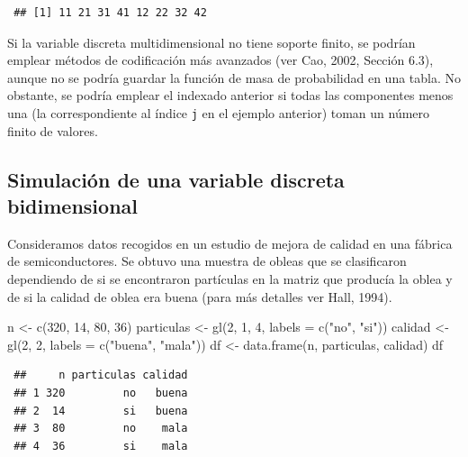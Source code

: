\documentclass[
]{book}
\newenvironment{Shaded}{\begin{snugshade}}{\end{snugshade}}
\newcommand{\AttributeTok}[1]{\textcolor[rgb]{0.77,0.63,0.00}{#1}}
\newcommand{\DecValTok}[1]{\textcolor[rgb]{0.00,0.00,0.81}{#1}}
\newcommand{\FunctionTok}[1]{\textcolor[rgb]{0.00,0.00,0.00}{#1}}
\newcommand{\NormalTok}[1]{#1}
\newcommand{\OtherTok}[1]{\textcolor[rgb]{0.56,0.35,0.01}{#1}}
\newcommand{\StringTok}[1]{\textcolor[rgb]{0.31,0.60,0.02}{#1}}
\theoremstyle{break}
\theoremstyle{nonumberplain}
\begin{document}
\begin{verbatim}
 ## [1] 11 21 31 41 12 22 32 42
\end{verbatim}

Si la variable discreta multidimensional no tiene soporte finito, se podrían emplear métodos de codificación más avanzados (ver Cao, 2002, Sección 6.3), aunque no se podría guardar la función de masa de probabilidad en una tabla.
No obstante, se podría emplear el indexado anterior si todas las componentes menos una (la correspondiente al índice \texttt{j} en el ejemplo anterior) toman un número finito de valores.

\hypertarget{simulaciuxf3n-de-una-variable-discreta-bidimensional}{%
\subsection{Simulación de una variable discreta bidimensional}\label{simulaciuxf3n-de-una-variable-discreta-bidimensional}}

Consideramos datos recogidos en un estudio de mejora de calidad en una fábrica de semiconductores.
Se obtuvo una muestra de obleas que se clasificaron dependiendo de si se encontraron partículas en la matriz que producía la oblea y de si la calidad de oblea era buena (para más detalles ver Hall, 1994).

\begin{Shaded}
\begin{Highlighting}[]
\NormalTok{n }\OtherTok{\textless{}{-}} \FunctionTok{c}\NormalTok{(}\DecValTok{320}\NormalTok{, }\DecValTok{14}\NormalTok{, }\DecValTok{80}\NormalTok{, }\DecValTok{36}\NormalTok{)}
\NormalTok{particulas }\OtherTok{\textless{}{-}} \FunctionTok{gl}\NormalTok{(}\DecValTok{2}\NormalTok{, }\DecValTok{1}\NormalTok{, }\DecValTok{4}\NormalTok{, }\AttributeTok{labels =} \FunctionTok{c}\NormalTok{(}\StringTok{"no"}\NormalTok{, }\StringTok{"si"}\NormalTok{))}
\NormalTok{calidad }\OtherTok{\textless{}{-}} \FunctionTok{gl}\NormalTok{(}\DecValTok{2}\NormalTok{, }\DecValTok{2}\NormalTok{, }\AttributeTok{labels =} \FunctionTok{c}\NormalTok{(}\StringTok{"buena"}\NormalTok{, }\StringTok{"mala"}\NormalTok{))}
\NormalTok{df }\OtherTok{\textless{}{-}} \FunctionTok{data.frame}\NormalTok{(n, particulas, calidad)}
\NormalTok{df}
\end{Highlighting}
\end{Shaded}

\begin{verbatim}
 ##     n particulas calidad
 ## 1 320         no   buena
 ## 2  14         si   buena
 ## 3  80         no    mala
 ## 4  36         si    mala
\end{verbatim}
\end{document}

